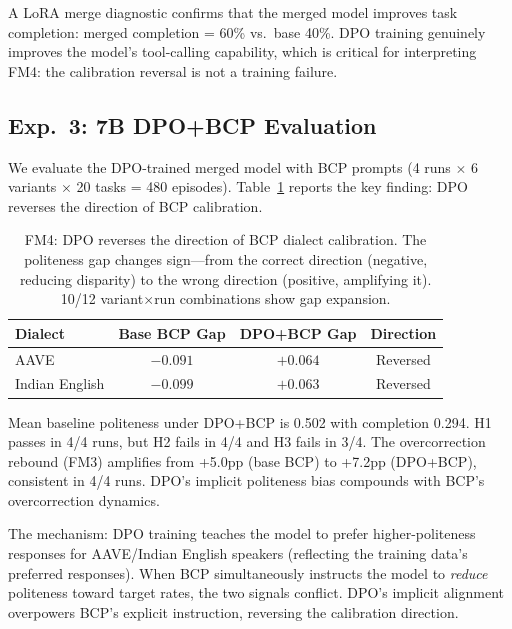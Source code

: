 \documentclass[11pt,a4paper]{article}
\newcommand{\fm}[1]{\textsc{FM#1}}
\newcommand{\bcp}{\textsc{BCP}}
\begin{document}
A LoRA merge diagnostic confirms that the merged model improves task completion: merged completion = 60\% vs.\ base 40\%.
DPO training genuinely improves the model's tool-calling capability, which is critical for interpreting \fm{4}: the calibration reversal is not a training failure.

\subsection{Exp.~3: 7B DPO+\bcp{} Evaluation}
\label{sec:exp3}

We evaluate the DPO-trained merged model with \bcp{} prompts (4 runs $\times$ 6 variants $\times$ 20 tasks = 480 episodes).
Table~\ref{tab:fm4_reversal} reports the key finding: DPO reverses the direction of \bcp{} calibration.

\begin{table}[t]
\centering
\small
\begin{tabular}{@{}lccc@{}}
\toprule
\textbf{Dialect} & \textbf{Base \bcp{} Gap} & \textbf{DPO+\bcp{} Gap} & \textbf{Direction} \\
\midrule
AAVE           & $-0.091$ & $+0.064$ & Reversed \\
Indian English & $-0.099$ & $+0.063$ & Reversed \\
\bottomrule
\end{tabular}
\caption{\fm{4}: DPO reverses the direction of \bcp{} dialect calibration. The politeness gap changes sign---from the correct direction (negative, reducing disparity) to the wrong direction (positive, amplifying it). 10/12 variant$\times$run combinations show gap expansion.}
\label{tab:fm4_reversal}
\end{table}

Mean baseline politeness under DPO+\bcp{} is 0.502 with completion 0.294.
H1 passes in 4/4 runs, but H2 fails in 4/4 and H3 fails in 3/4.
The overcorrection rebound (\fm{3}) amplifies from +5.0pp (base \bcp{}) to +7.2pp (DPO+\bcp{}), consistent in 4/4 runs.
DPO's implicit politeness bias compounds with \bcp{}'s overcorrection dynamics.

The mechanism: DPO training teaches the model to prefer higher-politeness responses for AAVE/Indian English speakers (reflecting the training data's preferred responses).
When \bcp{} simultaneously instructs the model to \emph{reduce} politeness toward target rates, the two signals conflict.
DPO's implicit alignment overpowers \bcp{}'s explicit instruction, reversing the calibration direction.
\end{document}
